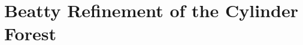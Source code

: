 \documentclass[12pt, oneside]{article}
\numberwithin{equation}{section}
\theoremstyle{definition}
\theoremstyle{plain}
\theoremstyle{remark}
\begin{document}













\section{Beatty Refinement of the Cylinder Forest}
\label{sec:beatty-refinement-of-cylinder-forest}
\end{document}
